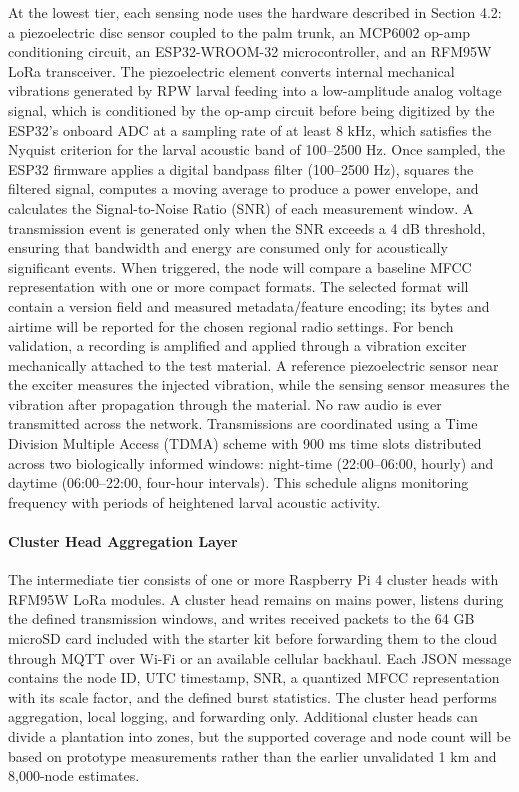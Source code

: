 \documentclass[12pt,a4paper,oneside]{memoir}
\newcommand{\newrevision}[1]{\textcolor{green!45!black}{#1}}
\begin{document}
At the lowest tier, each sensing node uses the hardware described in Section 4.2: a piezoelectric disc sensor coupled to the palm trunk, an MCP6002 op-amp conditioning circuit, an ESP32-WROOM-32 microcontroller, and an RFM95W LoRa transceiver. The piezoelectric element converts internal mechanical vibrations generated by RPW larval feeding into a low-amplitude analog voltage signal, which is conditioned by the op-amp circuit before being digitized by the ESP32's onboard ADC at a sampling rate of at least 8 kHz, which satisfies the Nyquist criterion for the larval acoustic band of 100--2500 Hz. Once sampled, the ESP32 firmware applies a digital bandpass filter (100--2500 Hz), squares the filtered signal, computes a moving average to produce a power envelope, and calculates the Signal-to-Noise Ratio (SNR) of each measurement window. A transmission event is generated only when the SNR exceeds a 4 dB threshold, ensuring that bandwidth and energy are consumed only for acoustically significant events. \newrevision{When triggered, the node will compare a baseline MFCC representation with one or more compact formats. The selected format will contain a version field and measured metadata/feature encoding; its bytes and airtime will be reported for the chosen regional radio settings. For bench validation, a recording is amplified and applied through a vibration exciter mechanically attached to the test material. A reference piezoelectric sensor near the exciter measures the injected vibration, while the sensing sensor measures the vibration after propagation through the material.} No raw audio is ever transmitted across the network. Transmissions are coordinated using a Time Division Multiple Access (TDMA) scheme with 900 ms time slots distributed across two biologically informed windows: night-time (22:00--06:00, hourly) and daytime (06:00--22:00, four-hour intervals). This schedule aligns monitoring frequency with periods of heightened larval acoustic activity.

\paragraph{Cluster Head Aggregation Layer}

The intermediate tier consists of one or more Raspberry Pi 4 cluster heads with RFM95W LoRa modules. A cluster head remains on mains power, listens during the defined transmission windows, and writes received packets to the 64 GB microSD card included with the starter kit before forwarding them to the cloud through MQTT over Wi-Fi or an available cellular backhaul. Each JSON message contains the node ID, UTC timestamp, SNR, a quantized MFCC representation with its scale factor, and the defined burst statistics. The cluster head performs aggregation, local logging, and forwarding only. Additional cluster heads can divide a plantation into zones, but the supported coverage and node count will be based on prototype measurements rather than the earlier unvalidated 1 km and 8,000-node estimates.
\end{document}
